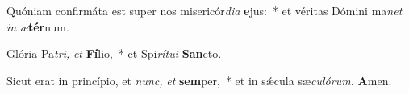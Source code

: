 \item Quóniam confirmáta est super nos misericór\textit{di}\textit{a} \textbf{e}jus:~* et véritas Dómini ma\textit{net} \textit{in} \textit{æ}\textbf{tér}num.
\item Glória Pa\tinyhspace\textit{tri,} \textit{et} \textbf{Fí}lio,~* et Spi\tinyhspace\textit{rítui} \textbf{San}cto.
\item Sicut erat in princípio, et \textit{nunc,} \textit{et} \textbf{sem}per,~* et in sǽcula sæ\tinyhspace\textit{culórum.} \textbf{A}men.